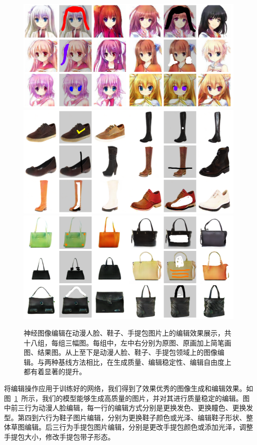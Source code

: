 \documentclass[a4paper,12pt,UTF8]{ctexart}
\newcommand{\kai}{\CJKfamily{zhkai}}	%
\begin{document}
\begin{figure}[H]
  \centering
  \includegraphics[width=1\linewidth]{figs/pic.png}
  \includegraphics[width=1\linewidth]{figs/shoes.png}
  \includegraphics[width=1\linewidth]{figs/handbags.png}
  \caption{\kai 神经图像编辑在动漫人脸、鞋子、手提包图片上的编辑效果展示，共十八组，每组三幅图。每组中，左中右分别为原图、原画加上简笔画图、结果图。从上至下是动漫人脸、鞋子、手提包领域上的图像编辑。与两种基线方法相比，在生成质量、编辑稳定性、编辑自由度上都有着显著的提升。}
  \label{fig:pic}
\end{figure}

将编辑操作应用于训练好的网络，我们得到了效果优秀的图像生成和编辑效果。如图~\ref{fig:pic}~所示，我们的模型能够生成高质量的图片，并对其进行质量稳定的编辑。图中前三行为动漫人脸编辑，每一行的编辑方式分别是更换发色、更换瞳色、更换发型。第四到六行为鞋子图片编辑，分别为更换鞋子颜色或光泽、编辑鞋子形状、整体草图编辑。后三行为手提包图片编辑，分别是更改手提包颜色或添加光泽，调整手提包大小，修改手提包带子形态。
\end{document}
